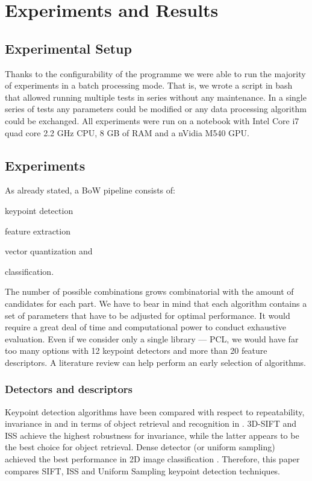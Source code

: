\chapter{Experiments and Results}

\section{Experimental Setup}
	Thanks to the configurability of the programme we were able to run the majority of experiments in a batch processing mode. That is, we wrote a script in bash that allowed running multiple tests in series without any maintenance. In a single series of tests any parameters could be modified or any data processing algorithm could be exchanged. All experiments were run on a notebook with Intel Core i7 quad core 2.2 GHz CPU, 8 GB of RAM and a nVidia M540 GPU.

\section{Experiments}	
	As already stated, a BoW pipeline consists of:
	\begin{inparaenum}[\upshape(1\upshape)]
	\item keypoint detection
	\item feature extraction 
	\item vector quantization and
	\item classification.
	\end{inparaenum}
	The number of possible combinations grows combinatorial with the amount of candidates for each part. We have to bear in mind that each algorithm contains a set of parameters that have to be adjusted for optimal performance. It would require a great deal of time and computational power to conduct exhaustive evaluation. Even if we consider only a single library --- PCL, we would have far too many options with 12 keypoint detectors and more than 20 feature descriptors. A literature review can help perform an early selection of algorithms.	
	
	\subsection{Detectors and descriptors}
	Keypoint detection algorithms have been compared with respect to repeatability, invariance in \cite{pcl_keypoint_comparision} and in terms of object retrieval and recognition in \cite{3d_keypoint_eval}. 3D-SIFT and ISS achieve the highest robustness for invariance, while the latter appears to be the best choice for object retrieval. Dense detector (or uniform sampling) achieved the best performance in 2D image classification \cite{tsai2012bag}. Therefore, this paper compares SIFT, ISS and Uniform Sampling keypoint detection techniques. 
	
